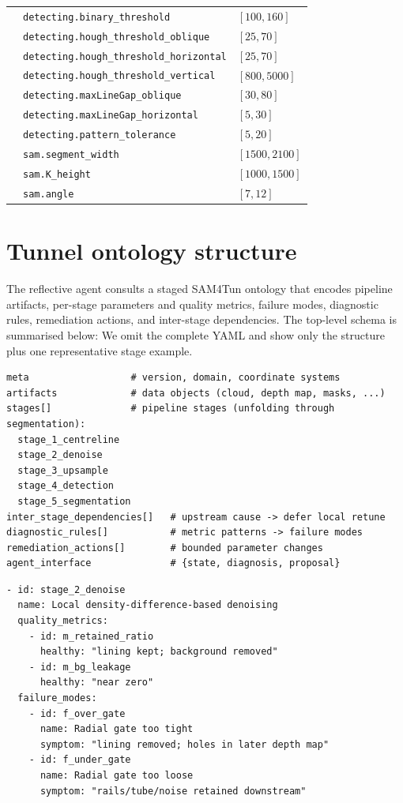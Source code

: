 \documentclass[a4paper,fleqn]{cas-dc}
\begin{document}
{\begin{table}[t]
{\begin{tabular*}{\textwidth}{@{\extracolsep{\fill}} llp{} @{}}
 & \texttt{detecting.binary\_threshold} & $[100,160]$ \\
 & \texttt{detecting.hough\_threshold\_oblique} & $[25,70]$ \\
 & \texttt{detecting.hough\_threshold\_horizontal} & $[25,70]$ \\
 & \texttt{detecting.hough\_threshold\_vertical} & $[800,5000]$ \\
 & \texttt{detecting.maxLineGap\_oblique} & $[30,80]$ \\
 & \texttt{detecting.maxLineGap\_horizontal} & $[5,30]$ \\
 & \texttt{detecting.pattern\_tolerance} & $[5,20]$ \\
 & \texttt{sam.segment\_width} & $[1500,2100]$ \\
 & \texttt{sam.K\_height} & $[1000,1500]$ \\
 & \texttt{sam.angle} & $[7,12]$ \\
\bottomrule
\end{tabular*}}
\end{table}


\section{Tunnel ontology structure}\label{app:ontology}

The reflective agent consults a staged SAM4Tun ontology that encodes pipeline
artifacts, per-stage parameters and quality metrics, failure modes, diagnostic
rules, remediation actions, and inter-stage dependencies. The top-level schema
is summarised below:
We omit the complete YAML and show only the structure plus one representative
stage example.

\begin{lstlisting}[caption={Ontology top-level keys and stage inventory.},label={lst:ontology-structure}]
meta                  # version, domain, coordinate systems
artifacts             # data objects (cloud, depth map, masks, ...)
stages[]              # pipeline stages (unfolding through segmentation):
  stage_1_centreline
  stage_2_denoise
  stage_3_upsample
  stage_4_detection
  stage_5_segmentation
inter_stage_dependencies[]   # upstream cause -> defer local retune
diagnostic_rules[]           # metric patterns -> failure modes
remediation_actions[]        # bounded parameter changes
agent_interface              # {state, diagnosis, proposal}
\end{lstlisting}

\begin{lstlisting}[caption={Example ontology stage: radial denoising failure modes.},label={lst:ontology-example}]
- id: stage_2_denoise
  name: Local density-difference-based denoising
  quality_metrics:
    - id: m_retained_ratio
      healthy: "lining kept; background removed"
    - id: m_bg_leakage
      healthy: "near zero"
  failure_modes:
    - id: f_over_gate
      name: Radial gate too tight
      symptom: "lining removed; holes in later depth map"
    - id: f_under_gate
      name: Radial gate too loose
      symptom: "rails/tube/noise retained downstream"
\end{lstlisting}

}
\end{document}
